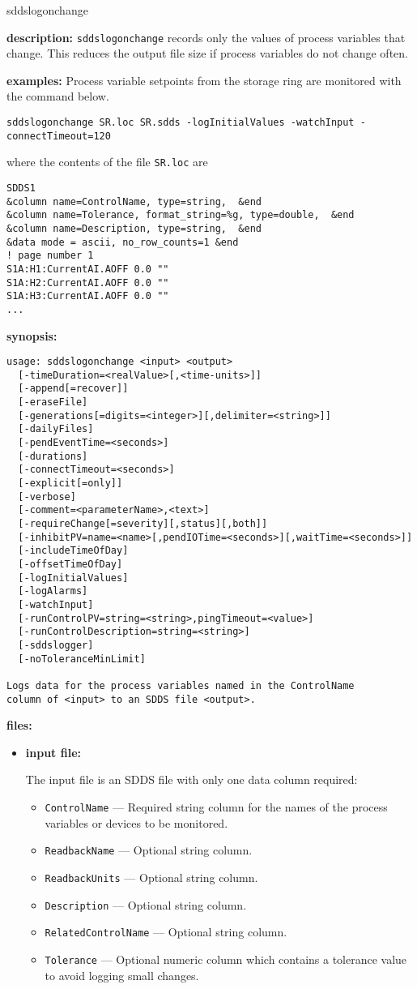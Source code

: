\begin{sddsprog}{sddslogonchange}
\item \textbf{description:}
\verb+sddslogonchange+ records only the values of process variables that change. This reduces the output file size if process variables do not change often.
\item \textbf{examples:}
%
Process variable setpoints from the storage ring are monitored
with the command below.
\begin{verbatim}
sddslogonchange SR.loc SR.sdds -logInitialValues -watchInput -connectTimeout=120
\end{verbatim}
where the contents of the file \verb+SR.loc+ are
\begin{verbatim}
SDDS1
&column name=ControlName, type=string,  &end
&column name=Tolerance, format_string=%g, type=double,  &end
&column name=Description, type=string,  &end
&data mode = ascii, no_row_counts=1 &end
! page number 1
S1A:H1:CurrentAI.AOFF 0.0 ""
S1A:H2:CurrentAI.AOFF 0.0 ""
S1A:H3:CurrentAI.AOFF 0.0 ""
...
\end{verbatim}
\item \textbf{synopsis:}
\begin{verbatim}
usage: sddslogonchange <input> <output>
  [-timeDuration=<realValue>[,<time-units>]]
  [-append[=recover]]
  [-eraseFile]
  [-generations[=digits=<integer>][,delimiter=<string>]]
  [-dailyFiles]
  [-pendEventTime=<seconds>]
  [-durations]
  [-connectTimeout=<seconds>]
  [-explicit[=only]]
  [-verbose]
  [-comment=<parameterName>,<text>]
  [-requireChange[=severity][,status][,both]]
  [-inhibitPV=name=<name>[,pendIOTime=<seconds>][,waitTime=<seconds>]]
  [-includeTimeOfDay]
  [-offsetTimeOfDay]
  [-logInitialValues]
  [-logAlarms]
  [-watchInput]
  [-runControlPV=string=<string>,pingTimeout=<value>]
  [-runControlDescription=string=<string>]
  [-sddslogger]
  [-noToleranceMinLimit]

Logs data for the process variables named in the ControlName
column of <input> to an SDDS file <output>.
\end{verbatim}
\item \textbf{files:}
\begin{itemize}
  \item \textbf{input file:}\par
The input file is an SDDS file with only one data column required:
  \begin{itemize}
    \item {\tt ControlName} --- Required string column for the names of the process variables or devices to be monitored.
    \item {\tt ReadbackName} --- Optional string column.
    \item {\tt ReadbackUnits} --- Optional string column.
    \item {\tt Description} --- Optional string column.
    \item {\tt RelatedControlName} --- Optional string column.
    \item {\tt Tolerance} --- Optional numeric column which contains a tolerance value to avoid logging small changes.
  \end{itemize}


\end{itemize}
\end{sddsprog}
